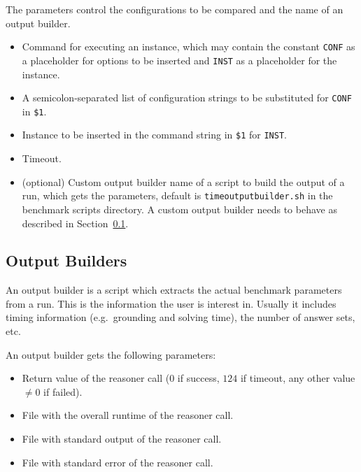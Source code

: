 \documentclass[a4paper]{article}
\begin{document}
		    The parameters control the configurations to be compared
		    and the name of an output builder.
		
		    \medskip{}
		    \begin{itemize}
				\item[{\tt \$1}:] Command for executing an instance, which may contain the constant {\tt CONF} as a placeholder
					for options to be inserted and {\tt INST} as a placeholder for the instance.
				\item[{\tt \$2}:] A semicolon-separated list of configuration strings to be substituted for {\tt CONF} in {\tt \$1}.
				\item[{\tt \$3}:] Instance to be inserted in the command string in {\tt \$1} for {\tt INST}.
				\item[{\tt \$4}:] Timeout.
				\item[{\tt \$5}:] (optional) Custom output builder name of a script to build the output of a run, which gets the parameters, default is {\tt timeoutputbuilder.sh}
					in the benchmark scripts directory. A custom output builder needs to behave as described in Section~\ref{sec:architecture:outputbuilder}.
		    \end{itemize}
	
		\subsection{Output Builders}
		\label{sec:architecture:outputbuilder}
				
			An output builder is a script which extracts the actual benchmark parameters
			from a run. This is the information the user is interest in. Usually it
			includes timing information (e.g.~grounding and solving time), the number of answer sets, etc.
			
			An output builder gets the following parameters:
			    \begin{itemize}
					\item[{\tt \$1}:] Return value of the reasoner call ($0$ if success, $124$ if timeout, any other value $\not= 0$ if failed).
					\item[{\tt \$2}:] File with the overall runtime of the reasoner call.
					\item[{\tt \$3}:] File with standard output of the reasoner call.
					\item[{\tt \$4}:] File with standard error of the reasoner call.
			    \end{itemize}
			
\end{document}

